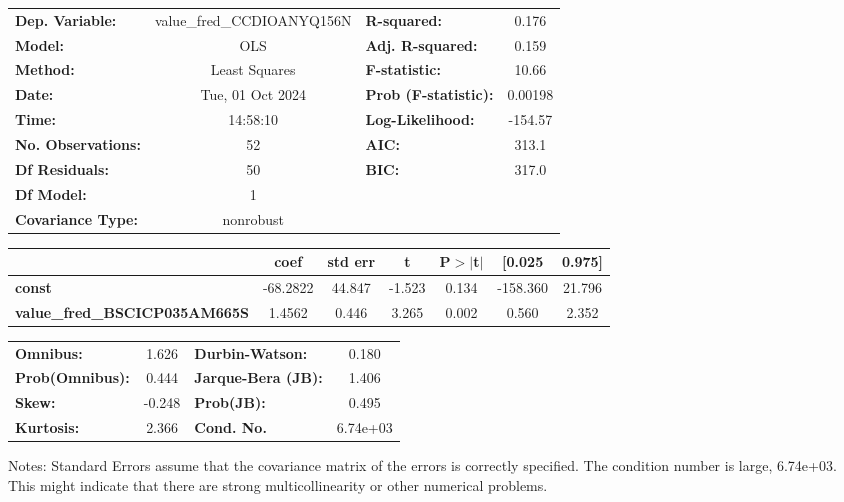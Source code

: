 \begin{center}
\begin{tabular}{lclc}
\toprule
\textbf{Dep. Variable:}               & value\_fred\_CCDIOANYQ156N & \textbf{  R-squared:         } &     0.176   \\
\textbf{Model:}                       &            OLS             & \textbf{  Adj. R-squared:    } &     0.159   \\
\textbf{Method:}                      &       Least Squares        & \textbf{  F-statistic:       } &     10.66   \\
\textbf{Date:}                        &      Tue, 01 Oct 2024      & \textbf{  Prob (F-statistic):} &  0.00198    \\
\textbf{Time:}                        &          14:58:10          & \textbf{  Log-Likelihood:    } &   -154.57   \\
\textbf{No. Observations:}            &               52           & \textbf{  AIC:               } &     313.1   \\
\textbf{Df Residuals:}                &               50           & \textbf{  BIC:               } &     317.0   \\
\textbf{Df Model:}                    &                1           & \textbf{                     } &             \\
\textbf{Covariance Type:}             &         nonrobust          & \textbf{                     } &             \\
\bottomrule
\end{tabular}
\begin{tabular}{lcccccc}
                                      & \textbf{coef} & \textbf{std err} & \textbf{t} & \textbf{P$> |$t$|$} & \textbf{[0.025} & \textbf{0.975]}  \\
\midrule
\textbf{const}                        &     -68.2822  &       44.847     &    -1.523  &         0.134        &     -158.360    &       21.796     \\
\textbf{value\_fred\_BSCICP035AM665S} &       1.4562  &        0.446     &     3.265  &         0.002        &        0.560    &        2.352     \\
\bottomrule
\end{tabular}
\begin{tabular}{lclc}
\textbf{Omnibus:}       &  1.626 & \textbf{  Durbin-Watson:     } &    0.180  \\
\textbf{Prob(Omnibus):} &  0.444 & \textbf{  Jarque-Bera (JB):  } &    1.406  \\
\textbf{Skew:}          & -0.248 & \textbf{  Prob(JB):          } &    0.495  \\
\textbf{Kurtosis:}      &  2.366 & \textbf{  Cond. No.          } & 6.74e+03  \\
\bottomrule
\end{tabular}
\end{center}

Notes: \newline
 [1] Standard Errors assume that the covariance matrix of the errors is correctly specified. \newline
 [2] The condition number is large, 6.74e+03. This might indicate that there are \newline
 strong multicollinearity or other numerical problems.